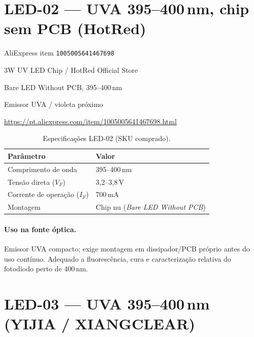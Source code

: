 \documentclass[11pt,a4paper]{article}
\begin{document}
\section{LED-02 --- UVA 395--400\,nm, chip sem PCB (HotRed)}

\begin{description}[style=nextline,leftmargin=2.2cm,font=\normalfont\bfseries]
  \item[Identificação] AliExpress item \texttt{1005005641467698}
  \item[Modelo / loja] 3W UV LED Chip / HotRed Official Store
  \item[SKU adquirido] Bare LED Without PCB, 395--400\,nm
  \item[Função] Emissor UVA / violeta próximo
  \item[Link] \url{https://pt.aliexpress.com/item/1005005641467698.html}
\end{description}

\begin{table}[ht]
\centering
\caption{Especificações LED-02 (SKU comprado).}
\begin{tabular}{@{}ll@{}}
\toprule
Parâmetro & Valor \\
\midrule
Comprimento de onda & 395--400\,nm \\
Tensão direta ($V_F$) & 3{,}2--3{,}8\,V \\
Corrente de operação ($I_F$) & 700\,mA \\
Montagem & Chip nu (\emph{Bare LED Without PCB}) \\
\bottomrule
\end{tabular}
\end{table}

\paragraph{Uso na fonte óptica.}
Emissor UVA compacto; exige montagem em dissipador/PCB próprio antes do uso
contínuo. Adequado a fluorescência, cura e caracterização relativa do
fotodiodo perto de 400\,nm.

\section{LED-03 --- UVA 395--400\,nm (YIJIA / XIANGCLEAR)}
\end{document}
